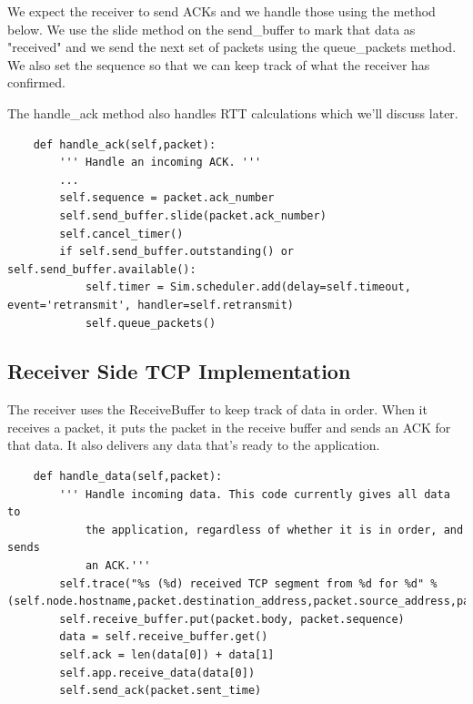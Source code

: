 \documentclass[11pt]{article}
\begin{document}
\vspace{5mm}

We expect the receiver to send ACKs and we handle those using the method below. We use the slide method on the send_buffer to mark that data as "received" and we send the next set of packets using the queue_packets method. We also set the sequence so that we can keep track of what the receiver has confirmed.

\vspace{5mm}

The handle_ack method also handles RTT calculations which we'll discuss later.

\vspace{5mm}

\begin{lstlisting}
    def handle_ack(self,packet):
        ''' Handle an incoming ACK. '''
        ...
        self.sequence = packet.ack_number
        self.send_buffer.slide(packet.ack_number)
        self.cancel_timer()
        if self.send_buffer.outstanding() or self.send_buffer.available():
            self.timer = Sim.scheduler.add(delay=self.timeout, event='retransmit', handler=self.retransmit)
            self.queue_packets()
\end{lstlisting}

\vspace{5mm}

\subsection{Receiver Side TCP Implementation}

The receiver uses the ReceiveBuffer to keep track of data in order. When it receives a packet, it puts the packet in the receive buffer and sends an ACK for that data. It also delivers any data that's ready to the application.

\vspace{5mm}

\begin{lstlisting}
    def handle_data(self,packet):
        ''' Handle incoming data. This code currently gives all data to
            the application, regardless of whether it is in order, and sends
            an ACK.'''
        self.trace("%s (%d) received TCP segment from %d for %d" % (self.node.hostname,packet.destination_address,packet.source_address,packet.sequence))
        self.receive_buffer.put(packet.body, packet.sequence)
        data = self.receive_buffer.get()
        self.ack = len(data[0]) + data[1]
        self.app.receive_data(data[0])
        self.send_ack(packet.sent_time)
\end{lstlisting}
\end{document}
